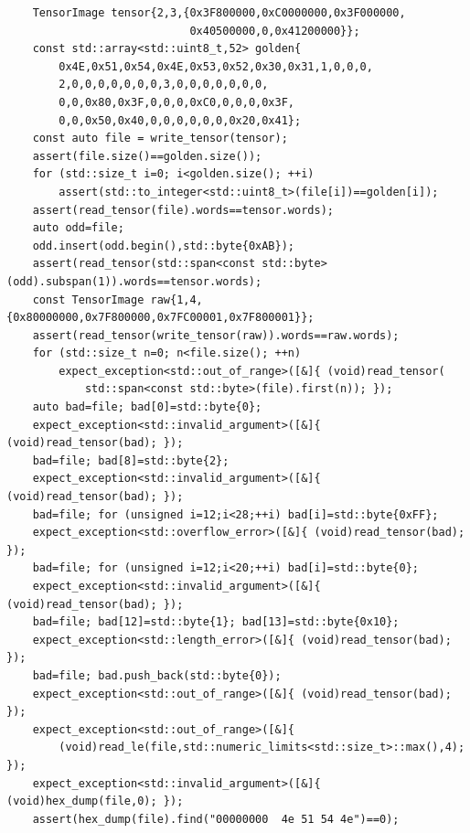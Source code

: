 \begin{verbatim}
    TensorImage tensor{2,3,{0x3F800000,0xC0000000,0x3F000000,
                            0x40500000,0,0x41200000}};
    const std::array<std::uint8_t,52> golden{
        0x4E,0x51,0x54,0x4E,0x53,0x52,0x30,0x31,1,0,0,0,
        2,0,0,0,0,0,0,0,3,0,0,0,0,0,0,0,
        0,0,0x80,0x3F,0,0,0,0xC0,0,0,0,0x3F,
        0,0,0x50,0x40,0,0,0,0,0,0,0x20,0x41};
    const auto file = write_tensor(tensor);
    assert(file.size()==golden.size());
    for (std::size_t i=0; i<golden.size(); ++i)
        assert(std::to_integer<std::uint8_t>(file[i])==golden[i]);
    assert(read_tensor(file).words==tensor.words);
    auto odd=file;
    odd.insert(odd.begin(),std::byte{0xAB});
    assert(read_tensor(std::span<const std::byte>(odd).subspan(1)).words==tensor.words);
    const TensorImage raw{1,4,{0x80000000,0x7F800000,0x7FC00001,0x7F800001}};
    assert(read_tensor(write_tensor(raw)).words==raw.words);
    for (std::size_t n=0; n<file.size(); ++n)
        expect_exception<std::out_of_range>([&]{ (void)read_tensor(
            std::span<const std::byte>(file).first(n)); });
    auto bad=file; bad[0]=std::byte{0};
    expect_exception<std::invalid_argument>([&]{ (void)read_tensor(bad); });
    bad=file; bad[8]=std::byte{2};
    expect_exception<std::invalid_argument>([&]{ (void)read_tensor(bad); });
    bad=file; for (unsigned i=12;i<28;++i) bad[i]=std::byte{0xFF};
    expect_exception<std::overflow_error>([&]{ (void)read_tensor(bad); });
    bad=file; for (unsigned i=12;i<20;++i) bad[i]=std::byte{0};
    expect_exception<std::invalid_argument>([&]{ (void)read_tensor(bad); });
    bad=file; bad[12]=std::byte{1}; bad[13]=std::byte{0x10};
    expect_exception<std::length_error>([&]{ (void)read_tensor(bad); });
    bad=file; bad.push_back(std::byte{0});
    expect_exception<std::out_of_range>([&]{ (void)read_tensor(bad); });
    expect_exception<std::out_of_range>([&]{
        (void)read_le(file,std::numeric_limits<std::size_t>::max(),4); });
    expect_exception<std::invalid_argument>([&]{ (void)hex_dump(file,0); });
    assert(hex_dump(file).find("00000000  4e 51 54 4e")==0);


\end{verbatim}
